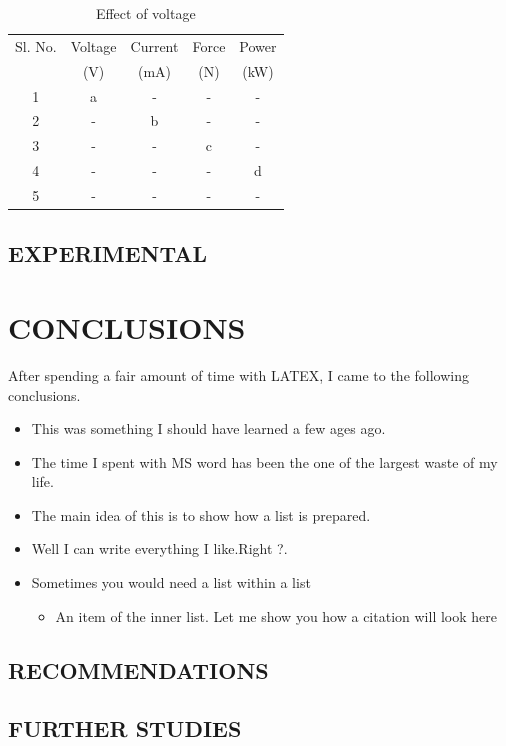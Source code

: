 \documentclass[12pt,a4paper]{report}
\begin{document}
\begin{table}[h!]
\centering
\caption{Effect of voltage}
\begin{tabular}{|c | c c | c c|} 
 \hline
 Sl. No. & Voltage & Current & Force & Power \\
  & (V) & (mA) & (N) & (kW) \\
 \hline
 1 & a & - & - & -  \\ 
 2 & - & b & - & - \\
 3 & - & - & c & - \\
 4 & - & - & - & d \\
 \hline
 5 & - & - & - & - \\ 
 \hline
\end{tabular}

\label{table:1}
\end{table}
\section{EXPERIMENTAL}
\lipsum[1]
\chapter{CONCLUSIONS}

After spending a fair amount of time with LATEX, I came to the following conclusions.
\begin{itemize}
  \item This was something I should have learned a few ages ago.
  \item The time I spent with MS word has been the one of the largest waste of my life.
  \item The main idea of this is to show  how a list is prepared.
  \item Well I can write everything I like.Right ?. 
  \item Sometimes you would need a list within a list
  	\begin{itemize}
  		\item An item of the inner list. Let me show you how a citation will look here \cite{grasham1952}
  	\end{itemize}
\end{itemize}

\section{RECOMMENDATIONS}
\lipsum[7-8]
\section{FURTHER STUDIES}
\lipsum[1]

\newpage
{}

 


\end{document}
